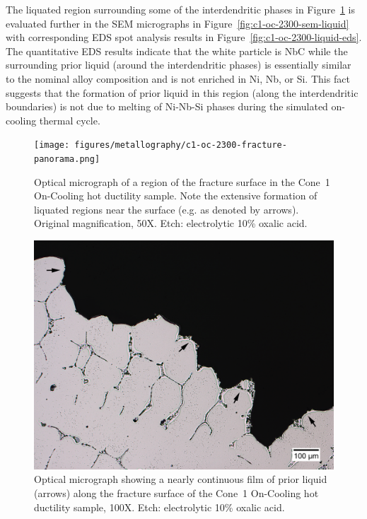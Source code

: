 {The liquated region surrounding some of the interdendritic phases in Figure~\ref{fig:c1-oc-2300-fracture-panorama} is evaluated further in the SEM micrographs in Figure~\ref{fig:c1-oc-2300-sem-liquid} with corresponding EDS spot analysis results in Figure~\ref{fig:c1-oc-2300-liquid-eds}. The quantitative EDS results indicate that the white particle is NbC while the surrounding prior liquid (around the interdendritic phases) is essentially similar to the nominal alloy composition and is not enriched in Ni, Nb, or Si. This fact suggests that the formation of prior liquid in this region (along the interdendritic boundaries) is not due to melting of Ni-Nb-Si phases during the simulated on-cooling thermal cycle.

\thispagestyle{lscapedplain}
\begin{landscape}
\begin{figure}
    \centering
    \texttt{[image: figures/metallography/c1-oc-2300-fracture-panorama.png]}
    \caption{Optical micrograph of a region of the fracture surface in the Cone~1 On-Cooling \protect{} hot ductility sample. Note the extensive formation of liquated regions near the surface (e.g. as denoted by arrows). Original magnification, 50X. Etch: electrolytic 10\% oxalic acid.}
    \label{fig:c1-oc-2300-fracture-panorama}
\end{figure}
\end{landscape}
\thispagestyle{headings}

\begin{figure}
    \centering
    \includegraphics[width=4.7in]{figures/metallography/c1-oc-2300-liquation-surface-100x.png}
    \caption{Optical micrograph showing a nearly continuous film of prior liquid (arrows) along the fracture surface of the Cone~1 On-Cooling \protect{} hot ductility sample, 100X. Etch: electrolytic 10\% oxalic acid.}
    \label{fig:c1-oc-2300-liquation-surface}
\end{figure}

}
